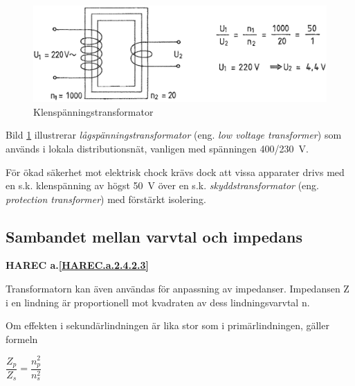 \begin{figure}[h]
\begin{center}
\includegraphics[width=\textwidth]{images/cropped_pdfs/bild_2_2-11.pdf}
\caption{Klenspänningstransformator}
\label{fig:BildII2-11}
\end{center}
\end{figure}

Bild \ref{fig:BildII2-11} illustrerar \emph{lågspänningstransformator} (eng.
\emph{low voltage transformer}) som används i lokala distributionsnät,
vanligen med spänningen 400/230~V.

För ökad säkerhet mot elektrisk chock krävs dock att vissa
apparater drivs med en s.k. klenspänning av högst 50~V över en s.k.
\emph{skyddstransformator} (eng. \emph{protection transformer}) med förstärkt
isolering.

\subsection{Sambandet mellan varvtal och impedans}
\textbf{HAREC a.\ref{HAREC.a.2.4.2.3}\label{myHAREC.a.2.4.2.3}}

Transformatorn kan även användas för anpassning av impedanser.
Impedansen Z i en lindning är proportionell mot kvadraten av dess
lindningsvarvtal n.

Om effekten i sekundärlindningen är lika stor som i primärlindningen, gäller
formeln

\(\dfrac{Z_p}{Z_s} = \dfrac{n_p^2}{n_s^2}\)
